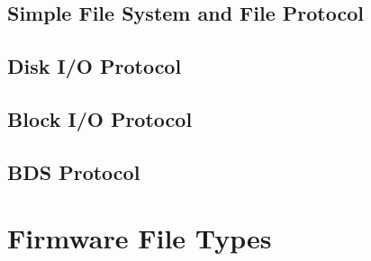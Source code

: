 \clearpage

\subsection{Simple File System and File Protocol}


\clearpage

\subsection{Disk \ac{I/O} Protocol}


\clearpage

\subsection{Block \ac{I/O} Protocol}


\clearpage



\clearpage

\subsection{\acl{BDS} Protocol}

\section{Firmware File Types}

